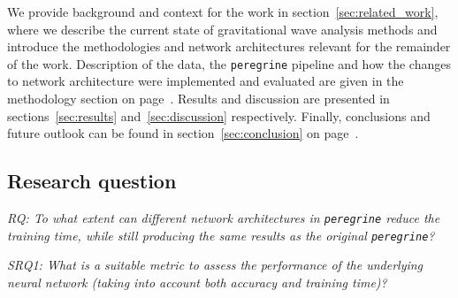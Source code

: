 We provide background and context for the work in section~\ref{sec:related_work}, where we describe the current state of gravitational wave analysis methods and introduce the methodologies and network architectures relevant for the remainder of the work. Description of the data, the \texttt{peregrine} pipeline and how the changes to network architecture were implemented and evaluated are given in the methodology section on page~\pageref{sec:methodology}. Results and discussion are presented in sections~\ref{sec:results} and~\ref{sec:discussion} respectively. Finally, conclusions and future outlook can be found in section~\ref{sec:conclusion} on page~\pageref{sec:conclusion}.

\subsection*{Research question}

\noindent \textit{RQ: To what extent can different network architectures in \texttt{peregrine} reduce the training time, while still producing the same results as the original \texttt{peregrine}?}

\noindent \textit{SRQ1: What is a suitable metric to assess the performance of the underlying neural network (taking into account both accuracy and training time)?}
